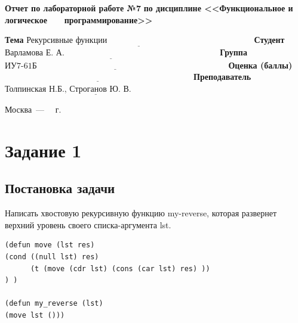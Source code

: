 \documentclass[12pt]{report}
\begin{document}
\begin{titlepage}
		\begin{center}
			\noindent\begin{minipage}{1.1\textwidth}\centering
				\Large\textbf{  Отчет по лабораторной работе №7}\newline
				\textbf{по дисциплине <<Функциональное и логическое}\newline
				\textbf{~~~программирование>>}\newline\newline
			\end{minipage}
		\end{center}
		
		\noindent\textbf{Тема} $\underline{\text{Рекурсивные функции~~~~~~~~~~~~~~~~~~~~~~~~~~~~~~~~~~~~~~~~~~~~~~~~~~~~}}$\newline\newline
		\noindent\textbf{Студент} $\underline{\text{Варламова Е. А.~~~~~~~~~~~~~~~~~~~~~~~~~~~~~~~~~~~~~~~~~~~~~~~~~~~~~~~}}$\newline\newline
		\noindent\textbf{Группа} $\underline{\text{ИУ7-61Б~~~~~~~~~~~~~~~~~~~~~~~~~~~~~~~~~~~~~~~~~~~~~~~~~~~~~~~~~~~~~~~~~~~~}}$\newline\newline
		\noindent\textbf{Оценка (баллы)} $\underline{\text{~~~~~~~~~~~~~~~~~~~~~~~~~~~~~~~~~~~~~~~~~~~~~~~~~~~~~~~~~~~~~~~~~~~}}$\newline\newline
		\noindent\textbf{Преподаватель} $\underline{\text{Толпинская Н.Б., Строганов Ю. В.~~~~~~~~~~~~~~~~~~~~}}$\newline\newline\newline
		
		\begin{center}
			\vfill
			Москва~---~\the\year
			~г.
		\end{center}
	\end{titlepage}
\setcounter{page}{2}
\section*{Задание 1}
\subsection*{Постановка задачи}
Написать хвостовую рекурсивную функцию my-reverse, которая развернет верхний
уровень своего списка-аргумента lst.

\begin{lstlisting}
(defun move (lst res)
(cond ((null lst) res)
      (t (move (cdr lst) (cons (car lst) res) ))
) )

(defun my_reverse (lst)
(move lst ()))
\end{lstlisting}
\end{document}
